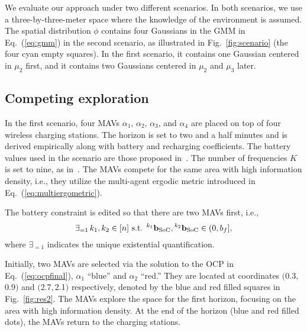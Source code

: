 \documentclass[letterpaper,10pt,conference,twoside]{IEEEtran}
\theoremstyle{definition}
\begin{document}
We evaluate our approach under two different scenarios. In both scenarios, we use a three-by-three-meter space where the knowledge of the environment is assumed. The spatial distribution $\phi$ contains four Gaussians in the GMM in Eq.~(\ref{eq:gmm}) in the second scenario, as illustrated in Fig.~\ref{fig:scenario} (the four cyan empty squares). In the first scenario, it contains one Gaussian centered in $\mu_2$ first, and it contains two Gaussians centered in $\mu_2$ and $\mu_3$ later.

\subsection*{Competing exploration}
\noindent
In the first scenario, four MAVs $\alpha_1$, $\alpha_2$, $\alpha_3$, and $\alpha_4$ are placed on top of four wireless charging stations. %
The horizon is set to two and a half minutes and is derived empirically along with battery and recharging coefficients. The battery values used in the scenario are those proposed in~\cite{zhao2017observability}. The number of frequencies $K$ is set to nine, as in~\cite{calinon2020mixture}. %
The MAVs compete for the same area with high information density, i.e., they utilize the multi-agent ergodic metric introduced in Eq.~(\ref{eq:multiergometric}).

The battery constraint is edited so that there are two MAVs first, i.e.,\vspace*{-.15cm}
\begin{equation}
\exists_{=1}\, k_1,k_2\in[n]\text{ s.t. }{}^{k_1} \mathbf{b}_{\text{SoC}},{}^{k_2} \mathbf{b}_{\text{SoC}}\in(0,b_f],\vspace*{-.1cm}
\end{equation} 
where %
$\exists_{=1}$ indicates the unique existential quantification.

Initially, two MAVs are selected via the solution to the OCP in Eq.~(\ref{eq:ocpfinal}), $\alpha_1$ ``blue'' and $\alpha_2$ ``red.'' They are located at coordinates $($0.3$,$0.9$)$ and $($2.7$,$2.1$)$ respectively, denoted by the blue and red filled squares in Fig.~\ref{fig:res2}. The MAVs explore the space for the first horizon, focusing on the area with high information density. At the end of the horizon (blue and red filled dots), the MAVs return to the charging stations. %
\end{document}
